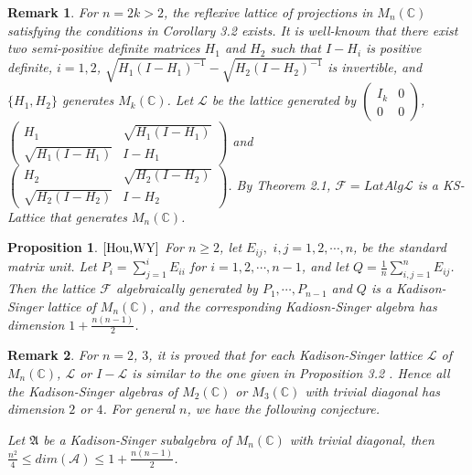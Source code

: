 \documentclass[12pt]{article}
\newtheorem{prop}{Proposition}[section]
\newtheorem{remark}{Remark}[section]
\newcommand{\AAA}{\mathfrak A}
\newcommand{\LLL}{\mathcal L} %
\newcommand{\FFF}{\mathcal F}
\newcommand{\C}{\mathbb C} %
\def\L{{\mathcal{L}}}
\begin{document}
{\begin{remark} For $n=2k>2$, the reflexive lattice of projections in $M_n(\C)$ satisfying the conditions in Corollary 3.2 exists. It is well-known that there exist two semi-positive definite matrices
$H_1$ and $H_2$ such that $I-H_i$ is positive definite, $i=1,2$,
$\sqrt{H_{1}(I-H_{1})^{-1}}-\sqrt{H_{2}(I-H_{2})^{-1}}$ is
invertible, and $\{H_1,H_2\}$ generates $M_k(\C)$. Let $\LLL$ be the lattice generated by $\left(\begin{array}{cc} I_k & 0\\
0&0\end{array}\right)$, $\left(\begin{array}{cc} H_1 & \sqrt{H_1
(I-H_1)} \\ \sqrt{H_1 (I-H_1)} & I - H_1\end{array}\right)$ and $
\left(\begin{array}{cc} H_2 & \sqrt{H_2(I-H_2)} \\
\sqrt{H_2(I-H_2)} & I - H_2\end{array}\right)$.  By Theorem
2.1, $\FFF=LatAlg\LLL$ is a KS-Lattice that generates $M_n(\C)$. 
\end{remark}

\begin{prop}${\mbox{\cite{Hou,WY}}}$ For $n\geq 2$, let
$E_{ij},\,\, i,j=1,2,\cdots,n$, be the standard matrix unit. Let
$P_i=\sum\limits_{j=1}^{i}E_{ii}$ for $i=1,2,\cdots, n-1$, and let
$Q= \frac 1n\sum\limits_{i,j=1}^nE_{ij}$. Then the lattice $\FFF$
algebraically generated by  $P_1,\cdots,P_{n-1}$ and $Q$ is a
Kadison-Singer lattice of $M_n(\C)$, and the corresponding Kadiosn-Singer
algebra has dimension $1+\frac{n(n-1)}{2}$.
\end{prop}

\begin{remark} For $n=2$, $3$, it is 
proved that for each Kadison-Singer lattice $\L$ of $M_n(\C)$, $\L$
or $I-\L$ is similar to the one given in Proposition 3.2 \cite{Tan}. Hence
all the Kadison-Singer algebras of $M_2(\C)$ or $M_3(\C)$  with
trivial diagonal has dimension $2$ or $4$. For general $n$, we have the following
conjecture.

\vspace{2mm}

\quad Let $\AAA$  be a
Kadison-Singer subalgebra of $M_n(\C)$ with trivial diagonal, then
$\frac{n^2}{4}\leq dim(\mathcal{A})\leq 1+\frac{n(n-1)}{2}$.
\end{remark}


}
\end{document}
